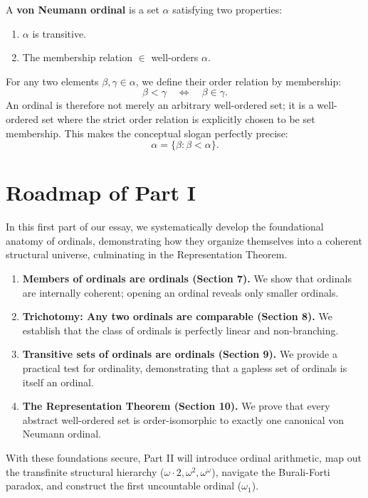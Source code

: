 \documentclass[11pt]{article}
\begin{document}
\begin{definition}
A \textbf{von Neumann ordinal} is a set $\alpha$ satisfying two properties:
\begin{enumerate}[label=(\textnormal{Or\arabic*})]
\item $\alpha$ is transitive.
\item The membership relation $\in$ well-orders $\alpha$.
\end{enumerate}
\end{definition}

For any two elements $\beta,\gamma\in\alpha$, we define their order relation by membership:
\[
\beta<\gamma \quad \Longleftrightarrow \quad \beta\in\gamma.
\]
An ordinal is therefore not merely an arbitrary well-ordered set; it is a well-ordered set where the strict order relation is explicitly chosen to be set membership. This makes the conceptual slogan perfectly precise:
\[
\boxed{\alpha=\{\beta:\beta<\alpha\}.}
\]

\section{Roadmap of Part I}

In this first part of our essay, we systematically develop the foundational anatomy of ordinals, demonstrating how they organize themselves into a coherent structural universe, culminating in the Representation Theorem.

\begin{enumerate}
\item \textbf{Members of ordinals are ordinals (Section 7).} We show that ordinals are internally coherent; opening an ordinal reveals only smaller ordinals.
\item \textbf{Trichotomy: Any two ordinals are comparable (Section 8).} We establish that the class of ordinals is perfectly linear and non-branching.
\item \textbf{Transitive sets of ordinals are ordinals (Section 9).} We provide a practical test for ordinality, demonstrating that a gapless set of ordinals is itself an ordinal.
\item \textbf{The Representation Theorem (Section 10).} We prove that every abstract well-ordered set is order-isomorphic to exactly one canonical von Neumann ordinal.
\end{enumerate}

With these foundations secure, Part II will introduce ordinal arithmetic, map out the transfinite structural hierarchy ($\omega \cdot 2, \omega^2, \omega^\omega$), navigate the Burali-Forti paradox, and construct the first uncountable ordinal ($\omega_1$).
\end{document}
